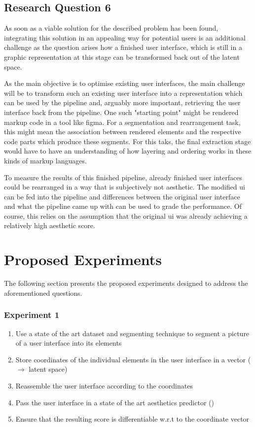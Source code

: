 \documentclass[10pt,a4paper]{scrartcl} %
\begin{document}
\subsection{Research Question 6}
As soon as a viable solution for the described problem has been found, integrating this solution in an appealing way for potential users is an additional challenge as the question arises how a finished user interface, which is still in a graphic representation at this stage can be transformed back out of the latent space.

As the main objective is to optimise existing user interfaces, the main challenge will be to transform such an existing user interface into a representation which can be used by the pipeline and, arguably more important, retrieving the user interface back from the pipeline. One such "starting point" might be rendered markup code in a tool like figma. For a segmentation and rearrangement task, this might mean the association between rendered elements and the respective code parts which produce these segments. For this taks, the final extraction stage would have to have an understanding of how layering and ordering works in these kinds of markup languages.

To measure the results of this finished pipeline, already finished user interfaces could be rearranged in a way that is subjectively not aesthetic. The modified \ac{ui} can be fed into the pipeline and differences between the original user interface and what the pipeline came up with can be used to grade the performance. Of course, this relies on the assumption that the original \ac{ui} was already achieving a relatively high aesthetic score.

\section{Proposed Experiments}
The following section presents the proposed experiments designed to address the aforementioned questions. 
\subsubsection{Experiment 1}
\begin{enumerate}
    \item Use a state of the art dataset and segmenting technique to segment a picture of a user interface into its elements
    \item Store coordinates of the individual elements in the user interface in a vector ($\to$ latent space)
    \item Reassemble the user interface according to the coordinates
    \item Pass the user interface in a state of the art aesthetics predictor (\cite{Leiva2023})
    \item Ensure that the resulting score is differentiable w.r.t to the coordinate vector
\end{enumerate}
\end{document}
